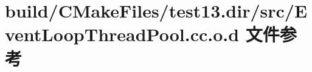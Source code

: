 \hypertarget{test13_8dir_2src_2EventLoopThreadPool_8cc_8o_8d}{}\section{build/\+C\+Make\+Files/test13.dir/src/\+Event\+Loop\+Thread\+Pool.cc.\+o.\+d 文件参考}
\label{test13_8dir_2src_2EventLoopThreadPool_8cc_8o_8d}
